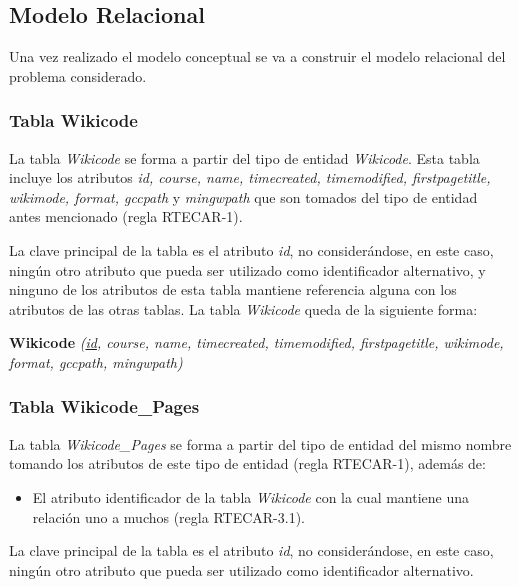 \newpage

\subsection{Modelo Relacional}

Una vez realizado el modelo conceptual se va a construir el modelo relacional del problema considerado.

\subsubsection{Tabla Wikicode}

La tabla \emph{Wikicode} se forma a partir del tipo de entidad \emph{Wikicode}. Esta tabla incluye los atributos \emph{id, course, name, timecreated, timemodified, firstpagetitle, wikimode, format, gccpath} y \emph{mingwpath} que son tomados del tipo de entidad antes mencionado (regla RTECAR-1).

La clave principal de la tabla es el atributo \emph{id}, no considerándose, en este caso, ningún otro atributo que pueda ser utilizado como identificador alternativo, y ninguno de los atributos de esta tabla mantiene referencia alguna con los atributos de las otras tablas. La tabla \emph{Wikicode} queda de la siguiente forma:

\begin{description}
	\item{\textbf{Wikicode}} \emph{(\underline{id}, course, name, timecreated, timemodified, firstpagetitle, wikimode, format, gccpath, mingwpath)}
\end{description}

\subsubsection{Tabla Wikicode\_Pages}

La tabla \emph{Wikicode\_Pages} se forma a partir del tipo de entidad del mismo nombre tomando los atributos de este tipo de entidad (regla RTECAR-1), además de:

\begin{itemize}
	\item El atributo identificador de la tabla \emph{Wikicode} con la cual mantiene una relación uno a muchos (regla RTECAR-3.1).
\end{itemize}

La clave principal de la tabla es el atributo \emph{id}, no considerándose, en este caso, ningún otro atributo que pueda ser utilizado como identificador alternativo.

